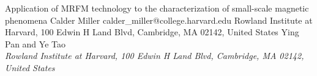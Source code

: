 \begin{conf-abstract}[]
{Application of MRFM technology to the characterization of small-scale magnetic phenomena}
{\color{blue} Calder Miller}
{calder\_miller@college.harvard.edu}
{Rowland Institute at Harvard, 100 Edwin H Land Blvd, Cambridge, MA 02142, United States}
{{\color{blue}Ying Pan and Ye Tao}\\ \textit{Rowland Institute at Harvard, 100 Edwin H Land Blvd, Cambridge, MA 02142, United States}\\ 
\decofourleft \decofourright}





\printbibliography[heading=none]

\end{conf-abstract}
